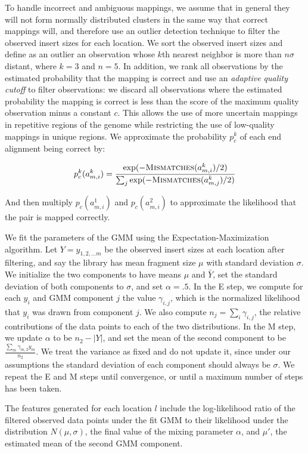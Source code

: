 \documentclass[11pt]{article}
\begin{document}
\begin{description}
To handle incorrect and ambiguous mappings, we assume that in general they will not form normally distributed clusters in the same way that correct mappings will, and therefore use an outlier detection technique to filter the observed insert sizes for each location. We sort the observed insert sizes and define as an outlier an observation whose $k$th nearest neighbor is more than $n\sigma$ distant, where $k = 3$ and $n = 5$. In addition, we rank all observations by the estimated probability that the mapping is correct and use an \emph{adaptive quality cutoff} to filter observations: we discard all observations where the estimated probability the mapping is correct is less than the score of the maximum quality observation minus a constant $c$. This allows the use of more uncertain mappings in repetitive regions of the genome while restricting the use of low-quality mappings in unique regions. We approximate the probability $p^{k}_c$ of each end alignment being correct by:

\[ p^{k}_c(a^{k}_{m,i}) = \frac{\exp({-\textsc{Mismatches}(a^{k}_{m,i})/2)}}{\sum_j{\exp(-\textsc{Mismatches}(a^{k}_{m,j})/2)}} \]

And then multiply $p_c(a^{1}_{m,i})$ and $p_c(a^{2}_{m,i})$ to approximate the likelihood that the pair is mapped correctly.

We fit the parameters of the GMM using the Expectation-Maximization algorithm. Let $Y = y_{1,2, \ldots m}$ be the observed insert sizes at each location after filtering, and say the library has mean fragment size $\mu$ with standard deviation $\sigma$. We initialize the two components to have means $\mu$ and $\bar{Y}$, set the standard deviation of both components to $\sigma$, and set $\alpha = .5$. In the E step, we compute for each $y_i$ and GMM component $j$ the value $\gamma_{i,j}$, which is the normalized likelihood that $y_i$ was drawn from component $j$. We also compute $n_j = \sum_i{\gamma_{i,j}}$, the relative contributions of the data points to each of the two distributions. In the M step, we update $\alpha$ to be $n_2 - \left|Y\right|$, and set the mean of the second component to be $\frac{\sum_m{\gamma_{m,2}y_m}}{n_2}$. We treat the variance as fixed and do not update it, since under our assumptions the standard deviation of each component should always be $\sigma$. We repeat the E and M steps until convergence, or until a maximum number of steps has been taken.

The features generated for each location $l$ include the log-likelihood ratio of the filtered observed data points under the fit GMM to their likelihood under the distribution $N(\mu,\sigma)$, the final value of the mixing parameter $\alpha$, and $\mu'$, the estimated mean of the second GMM component.


\end{description}
\end{document}

